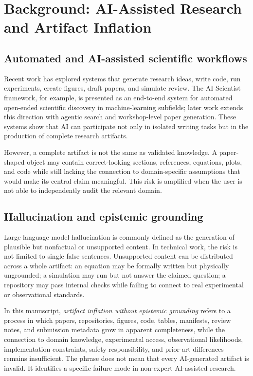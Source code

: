 \documentclass[a4paper,11pt]{article}
\begin{document}
\section{Background: AI-Assisted Research and Artifact Inflation}

\subsection{Automated and AI-assisted scientific workflows}

Recent work has explored systems that generate research ideas, write code, run experiments, create figures, draft papers, and simulate review. The AI Scientist framework, for example, is presented as an end-to-end system for automated open-ended scientific discovery in machine-learning subfields\cite{lu2024aiscientist}; later work extends this direction with agentic search and workshop-level paper generation\cite{yamada2025aiscientistv2}. These systems show that AI can participate not only in isolated writing tasks but in the production of complete research artifacts.

However, a complete artifact is not the same as validated knowledge. A paper-shaped object may contain correct-looking sections, references, equations, plots, and code while still lacking the connection to domain-specific assumptions that would make its central claim meaningful. This risk is amplified when the user is not able to independently audit the relevant domain.

\subsection{Hallucination and epistemic grounding}

Large language model hallucination is commonly defined as the generation of plausible but nonfactual or unsupported content\cite{huang2025hallucination}. In technical work, the risk is not limited to single false sentences. Unsupported content can be distributed across a whole artifact: an equation may be formally written but physically ungrounded; a simulation may run but not answer the claimed question; a repository may pass internal checks while failing to connect to real experimental or observational standards.

In this manuscript, \textit{artifact inflation without epistemic grounding} refers to a process in which papers, repositories, figures, code, tables, manifests, review notes, and submission metadata grow in apparent completeness, while the connection to domain knowledge, experimental access, observational likelihoods, implementation constraints, safety responsibility, and prior-art differences remains insufficient. The phrase does not mean that every AI-generated artifact is invalid. It identifies a specific failure mode in non-expert AI-assisted research.
\end{document}
